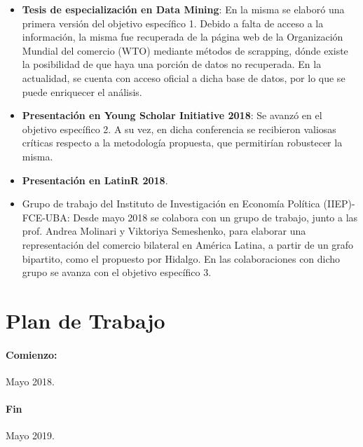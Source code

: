 \documentclass[runningheads,a4paper]{llncs}
\begin{document}
\begin{itemize}
	\item \textbf{Tesis de especialización en Data Mining}\cite{Kozlowski2018b}: En la misma se elaboró una primera versión del objetivo específico 1. Debido a falta de acceso a la información, la misma fue recuperada de la página web de la Organización Mundial del comercio (WTO) mediante métodos de scrapping, dónde existe la posibilidad de que haya una porción de datos no recuperada. En la actualidad, se cuenta con acceso oficial a dicha base de datos, por lo que se puede enriquecer el análisis.
	\item \textbf{Presentación en Young Scholar Initiative 2018}\cite{Kozlowski2018a}: Se avanzó en el objetivo específico 2. A su vez, en dicha conferencia se recibieron valiosas críticas respecto a la metodología propuesta, que permitirían robustecer la misma.
	\item \textbf{Presentación en LatinR 2018}\cite{Kozlowski2018}.
	\item Grupo de trabajo del Instituto de Investigación en Economía Política (IIEP)-FCE-UBA: Desde mayo 2018 se colabora con un grupo de trabajo, junto a las prof. Andrea Molinari y Viktoriya Semeshenko, para elaborar una representación del comercio bilateral en América Latina, a partir de un grafo bipartito, como el propuesto por Hidalgo. En las colaboraciones con dicho grupo se avanza con el objetivo específico 3.
\end{itemize}



\section{Plan de Trabajo}

\paragraph{Comienzo:} Mayo 2018.
\paragraph{Fin} Mayo 2019.
\end{document}
